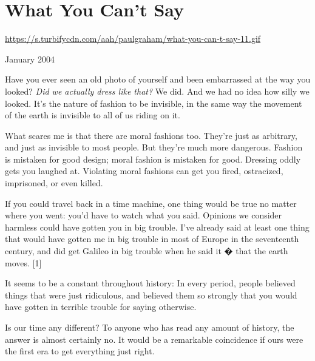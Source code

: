 \chapter{What You Can't Say}


            
              
                \href{https://s.turbifycdn.com/aah/paulgraham/what-you-can-t-say-11.gif}{https://s.turbifycdn.com/aah/paulgraham/what-you-can-t-say-11.gif}



January 2004


                  Have you ever seen an old photo of yourself and been
                  embarrassed at the way you looked?
                  \emph{Did we actually dress like that?} We did. And we had no
                  idea how silly we looked. It's the nature of fashion to be
                  invisible, in the same way the movement of the earth is
                  invisible to all of us riding on it.

What scares me
                  is that there are moral fashions too. They're just as
                  arbitrary, and just as invisible to most people. But they're
                  much more dangerous. Fashion is mistaken for good design;
                  moral fashion is mistaken for good. Dressing oddly gets you
                  laughed at. Violating moral fashions can get you fired,
                  ostracized, imprisoned, or even killed.

If you
                  could travel back in a time machine, one thing would be true
                  no matter where you went: you'd have to watch what you said.
                  Opinions we consider harmless could have gotten you in big
                  trouble. I've already said at least one thing that would have
                  gotten me in big trouble in most of Europe in the seventeenth
                  century, and did get Galileo in big trouble when he said it �
                  that the earth moves. [1]


                  It seems to be a constant throughout history: In every period,
                  people believed things that were just ridiculous, and believed
                  them so strongly that you would have gotten in terrible
                  trouble for saying otherwise.

Is our time any
                  different? To anyone who has read any amount of history, the
                  answer is almost certainly no. It would be a remarkable
                  coincidence if ours were the first era to get everything just
                  right.

